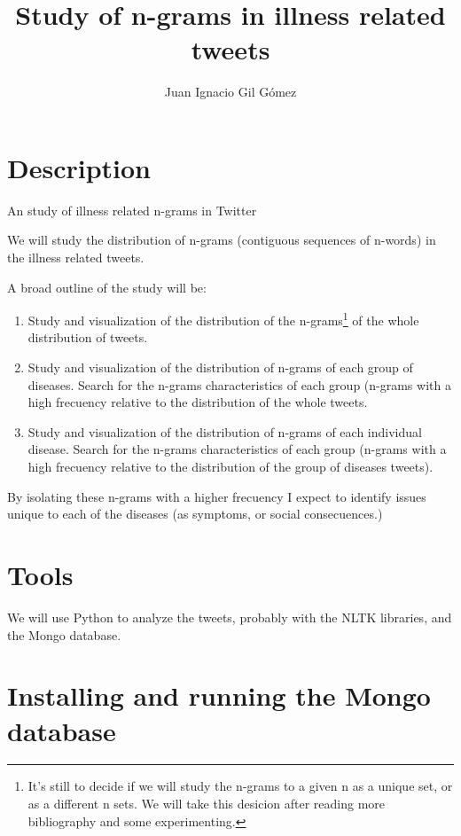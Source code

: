 \documentclass[11pt]{article} %
\title{Study of n-grams in illness related tweets}
\author{Juan Ignacio Gil G\'{o}mez}
\begin{document}
\maketitle

\section{Description}

An study of illness related n-grams in Twitter

We will study the distribution of n-grams (contiguous sequences of n-words) in the illness related tweets.

A broad outline of the study will be:
\begin{enumerate}
\item Study and visualization of the distribution of the n-grams\footnote{It's still to decide if we will study the n-grams to a given n as a unique set, or as a different n sets. We will take this desicion after reading more bibliography and some experimenting.} of the whole distribution of tweets.

\item Study and visualization of the distribution of n-grams of each group of diseases. Search for the n-grams characteristics of each group (n-grams with a high frecuency relative to the distribution of the whole tweets.

\item Study and visualization of the distribution of n-grams of each individual disease. Search for the n-grams characteristics of each group (n-grams with a high frecuency relative to the distribution of the group of diseases tweets).

\end{enumerate}

By isolating these n-grams with a higher frecuency I expect to identify issues unique to each of the diseases (as symptoms, or social consecuences.)

\section{Tools}

We will use Python to analyze the tweets, probably with the NLTK libraries, and the Mongo database.

\section{Installing and running the Mongo database}
\end{document}

